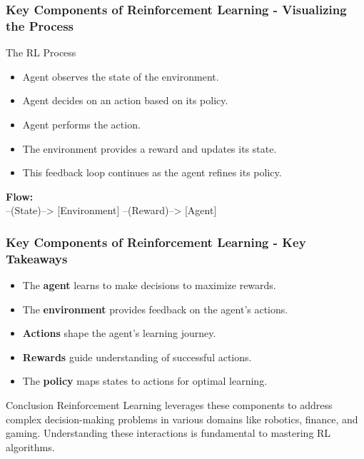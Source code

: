 \documentclass[aspectratio=169]{beamer}
\begin{document}
\begin{frame}[fragile]
    \frametitle{Key Components of Reinforcement Learning - Visualizing the Process}
    \begin{block}{The RL Process}
        \begin{itemize}
            \item Agent observes the state of the environment.
            \item Agent decides on an action based on its policy.
            \item Agent performs the action.
            \item The environment provides a reward and updates its state.
            \item This feedback loop continues as the agent refines its policy.
        \end{itemize}
    \end{block}
    
    \begin{center}
    \textbf{Flow:} \\
    [Agent] --(State)--> [Environment] --(Reward)--> [Agent]
    \end{center}
\end{frame}

\begin{frame}[fragile]
    \frametitle{Key Components of Reinforcement Learning - Key Takeaways}
    \begin{itemize}
        \item The \textbf{agent} learns to make decisions to maximize rewards.
        \item The \textbf{environment} provides feedback on the agent’s actions.
        \item \textbf{Actions} shape the agent's learning journey.
        \item \textbf{Rewards} guide understanding of successful actions.
        \item The \textbf{policy} maps states to actions for optimal learning.
    \end{itemize}
    
    \begin{block}{Conclusion}
        Reinforcement Learning leverages these components to address complex decision-making problems in various domains like robotics, finance, and gaming. Understanding these interactions is fundamental to mastering RL algorithms.
    \end{block}
\end{frame}
\end{document}
